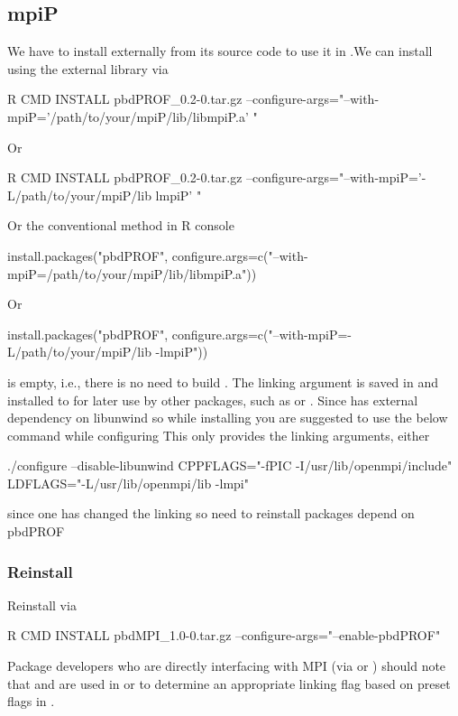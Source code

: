 \subsection{mpiP}
\label{sec:mpiP}

We have to install  externally from its source code to use it in
.We can install  using the external  library via
\begin{Command}
R CMD INSTALL pbdPROF_0.2-0.tar.gz --configure-args="--with-mpiP='/path/to/your/mpiP/lib/libmpiP.a' "
\end{Command}
Or
\begin{Command}
R CMD INSTALL pbdPROF_0.2-0.tar.gz --configure-args="--with-mpiP='-L/path/to/your/mpiP/lib lmpiP' "
\end{Command}
Or the conventional method in R console
\begin{Command}
install.packages("pbdPROF", configure.args=c("--with-mpiP=/path/to/your/mpiP/lib/libmpiP.a"))
\end{Command}
Or
\begin{Command}
install.packages("pbdPROF", configure.args=c("--with-mpiP=-L/path/to/your/mpiP/lib -lmpiP"))
\end{Command}


 is empty, i.e., there is no need to build .
The linking argument is saved in  and installed to
 for later use by other packages, such as  or .
Since  has external dependency  on libunwind so while installing 
 you are suggested to use the below command while configuring 
This only provides the linking arguments, either
\begin{Code}
./configure --disable-libunwind CPPFLAGS="-fPIC -I/usr/lib/openmpi/include" LDFLAGS="-L/usr/lib/openmpi/lib -lmpi"
\end{Code}
since one has changed the linking so need to reinstall packages depend on pbdPROF



\subsubsection{Reinstall }
\label{sec:pbdMPI}

Reinstall  via
\begin{Command}
R CMD INSTALL pbdMPI_1.0-0.tar.gz --configure-args="--enable-pbdPROF"
\end{Command}
Package developers who are directly interfacing with MPI (via  or ) 
should note that  and  are
used in  or  to determine an
appropriate linking flag  based on preset flags in
.

